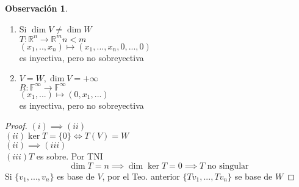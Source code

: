 \documentclass[11pt]{book}
\theoremstyle{definition}
\newtheorem{obs}{Observación}[section]
\begin{document}
\begin{obs}
	\
	\begin{enumerate}
		\item Si $\dim V\neq\dim W$\\
		      $T:\mathbb{R}^n\rightarrow\mathbb{R}^m n<m$\\
		      $(x_1,..,x_n)\mapsto (x_1,...,x_n,0,...,0)$\\
		      es inyectiva, pero no sobreyectiva

		\item $V=W,\dim V=+\infty$\\
		      $R:\mathbb{F}^\infty\rightarrow\mathbb{F}^\infty$\\
		      $(x_1,...)\mapsto (0,x_1,...)$\\
		      es inyectiva, pero no sobreyectiva
	\end{enumerate}
\end{obs}
\begin{proof}
	$(i)\implies (ii)$\\
	$(ii) \ker T=\{0\}\iff T(V)=W$\\
	$(ii)\implies (iii)$\\
	$(iii) T$ es sobre. Por TNI
	\[
		\dim T=n\implies\dim\ker T=0\implies T\textrm{ no singular}
	\]
	Si $\{v_1,...,v_n\}$ es base de $V$, por el Teo. anterior $\{Tv_1,...,Tv_n\}$ se base de $W$
\end{proof}
\end{document}
